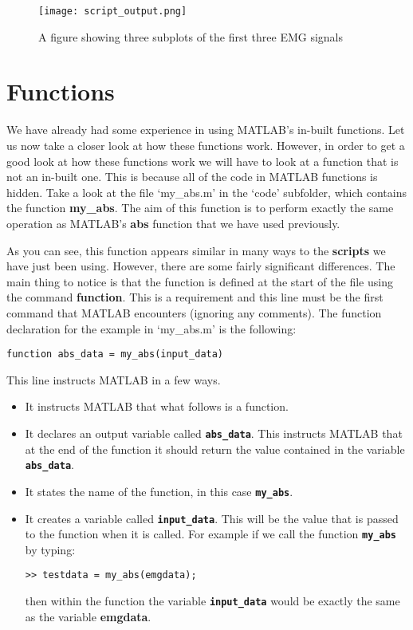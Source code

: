 \documentclass[12pt,a4paper]{article}
\begin{document}
\begin{figure}[H]
\begin{center}
\texttt{[image: script\_output.png]}
\caption{A figure showing three subplots of the first three EMG signals}
\label{fig:scriptoutput}
\end{center}
\end{figure}

\section{Functions}
We have already had some experience in using MATLAB's in-built functions.  
Let us now take a closer look at how these functions work.  
However, in order to get a good look at how these functions work we will have to look at a function that is not an in-built one.  
This is because all of the code in MATLAB functions is hidden.  
Take a look at the file `my\_abs.m' in the `code' subfolder, which contains the function \textbf{my\_abs}.  
The aim of this function is to perform exactly the same operation as MATLAB's \textbf{abs} function that we have used previously.

As you can see, this function appears similar in many ways to the \textbf{scripts} we have just been using.  
However, there are some fairly significant differences.  
The main thing to notice is that the function is defined at the start of the file using the command \textbf{function}.  
This is a requirement and this line must be the first command that MATLAB encounters (ignoring any comments).  
The function declaration for the example in `my\_abs.m' is the following:
\begin{lstlisting}[style=Matlab-editor]
function abs_data = my_abs(input_data)
\end{lstlisting}
This line instructs MATLAB in a few ways.
\begin{itemize}
\item It instructs MATLAB that what follows is a function.
\item It declares an output variable called \textbf{\texttt{abs\_data}}.  This instructs MATLAB that at the end of the function it should return the value contained in the variable \textbf{\texttt{abs\_data}}.
\item It states the name of the function, in this case \textbf{\texttt{my\_abs}}.
\item It creates a variable called \textbf{\texttt{input\_data}}.  This will be the value that is passed to the function when it is called.  For example if we call the function \textbf{\texttt{my\_abs}} by typing:
\begin{lstlisting}[style=Matlab-editor]
>> testdata = my_abs(emgdata);
\end{lstlisting}
then within the function the variable \textbf{\texttt{input\_data}} would be exactly the same as the variable \textbf{emgdata}.
\end{itemize}
\end{document}

